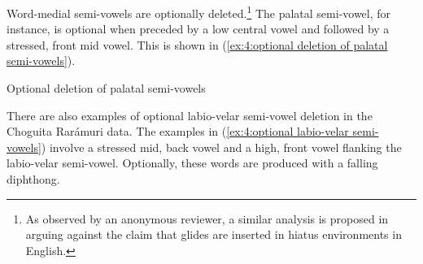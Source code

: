 Word-medial semi-vowels are optionally deleted.\footnote{As observed by an anonymous reviewer, a similar analysis is proposed in \citep{davidson2014hiatus} arguing against the claim that glides are inserted in hiatus environments in English.} The palatal semi-vowel, for instance, is optional when preceded by a low central vowel and followed by a stressed, front mid vowel. This is shown in (\ref{ex:4:optional deletion of palatal semi-vowels}).


\ea\label{ex:4:optional deletion of palatal semi-vowels}
Optional deletion of palatal semi-vowels

    \z
\z

There are also examples of optional labio-velar semi-vowel deletion in the Choguita Rarámuri data. The examples in (\ref{ex:4:optional labio-velar semi-vowels}) involve a stressed mid, back vowel and a high, front vowel flanking the labio-velar semi-vowel. Optionally, these words are produced with a falling diphthong.


